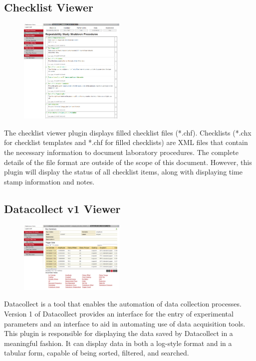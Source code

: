 \documentclass[10pt]{article}
\begin{document}
\subsection{Checklist Viewer}
\begin{figure}
		\includegraphics[width=0.45\textwidth]{Checklist_Viewer.png}
\end{figure}
The checklist viewer plugin displays filled checklist files (*.chf).  Checklists (*.chx for checklist templates and *.chf for filled checklists) are XML files that contain the necessary information to document laboratory procedures.  The complete details of the file format are outside of the scope of this document.  However, this plugin will display the status of all checklist items, along with displaying time stamp information and notes.

\endgroup

\clearpage
\begingroup
\setlength\intextsep{0pt}
\subsection{Datacollect v1 Viewer}
\begin{figure}
		\includegraphics[width=0.45\textwidth]{Datacollect_v1_Viewer.png}
\end{figure}
Datacollect is a tool that enables the automation of data collection processes.  Version 1 of Datacollect provides an interface for the entry of experimental parameters and an interface to aid in automating use of data acquisition tools.  This plugin is responsible for displaying the data saved by Datacollect in a meaningful fashion.  It can display data in both a log-style format and in a tabular form, capable of being sorted, filtered, and searched.
\end{document}

